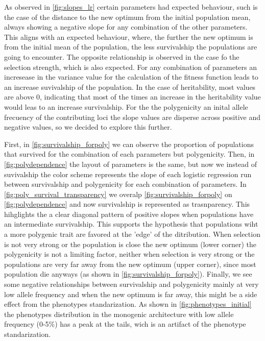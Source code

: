 \documentclass{article}
\begin{document}
As observed in \ref{fig:slopes_lr} certain parameters had expected behaviour, such is the case of the distance to the new optimum from the initial population mean, always showing a negative slope for any combination of the other parameters. This aligns with an expected behaviour, where, the further the new optimum is from the initial mean of the population, the less survivalship the populations are going to encounter. The opposite relationship is observed in the case fo the selection strength, which is also expected. For any combination of parameters an incresease in the variance value for the calculation of the fitness function leads to an increase suvivalship of the population. In the case of heritability, most values are above 0, indicating that most of the times an increase in the heritability value would leas to an increase survivalship. For the the polygenicity an inital allele frecuency of the contributing loci the slope values are disperse across positive and negative values, so we decided to explore this further. 

First, in \ref{fig:survivalship_forpoly} we can observe the proportion of populations that survived for the combination of each parameters but polygenicity. Then, in \ref{fig:polydependence} the layout of parameters is the same, but now we instead of suvivalship the color scheme represents the slope of each logistic regression run between  survivalship and polygenicity for each combination of parameters. In \ref{fig:poly_survival_transparency} we overalp \ref{fig:survivalship_forpoly} on \ref{fig:polydependence} and now survivalship is represented as trasnparency. This hihglights the a clear diagonal pattern of positive slopes when populations have an intermediate survivalship. This supports the hypothesis that populations wiht a more polygenic trait are favored at the 'edge' of the ditribution. When selection is not  very strong or the population is close the new optimum (lower corner) the polygenicity is not a limiting factor, neither when selection is very strong or the populations are very far away from the new optimum (upper corner), since most population die anyways (as shown in \ref{fig:survivalship_forpoly}). Finally, we see some negative relationships between survivalship and polygenicity mainly at very low allele frequency and when the new optimum is far away, this might be a side effect from the phenotypes standarization. As shown in \ref{fig:phenotypes_initial} the phenotypes distribution in the monogenic architecture with low allele frequency (0-5\%) has a peak at the tails, wich is an artifact of the phenotype standarization. 
\end{document}
